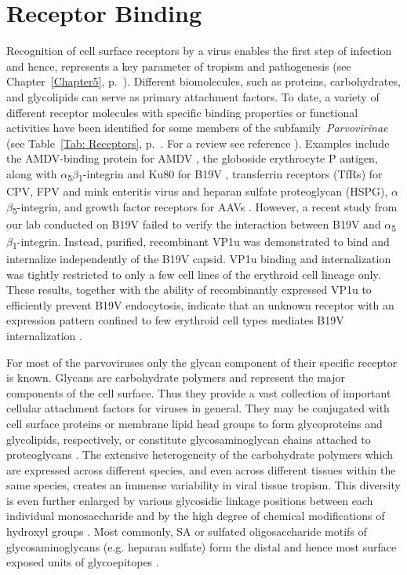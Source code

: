 \section{Receptor Binding}
\label{Binding}
Recognition of cell surface receptors by a virus enables the first step of infection and hence, represents a key parameter of tropism and pathogenesis (see Chapter~\ref{Chapter5}, p.~\pageref{Chapter5}). Different biomolecules, such as proteins, carbohydrates, and glycolipids can serve as primary attachment factors. To date, a variety of different receptor molecules with specific binding properties or functional activities have been identified for some members of the subfamily~\textit{Parvovirinae} (see Table~\ref{Tab: Receptors}, p.~\pageref{Tab: Receptors}. For a review see reference \cite{Receptor}). Examples include the AMDV-binding protein for AMDV \cite{pmid10196278}, the globoside erythrocyte P antigen, along with $\alpha$\textsubscript{5}$\beta$\textsubscript{1}-integrin and Ku80 for B19V \cite{pmid8211117, pmid15661151, pmid12907437, pmid16076874, weigel}, transferrin receptors (TfRs) for CPV, FPV and mink enteritis virus \cite{pmid16040076, pmid11264378} and heparan sulfate proteoglycan (HSPG), $\alpha$\textsubscript{}$\beta$\textsubscript{5}-integrin, and growth factor receptors for AAVs \cite{pmid14502277, pmid15596854, pmid9883842, pmid9445046, pmid9883843, pmid8599196}. However, a recent study from our lab conducted on B19V failed to verify the interaction between B19V and $\alpha$\textsubscript{5}$\beta$\textsubscript{1}-integrin. Instead, purified, recombinant VP1u was demonstrated to bind and internalize independently of the B19V capsid. VP1u binding and internalization was tightly restricted to only a few cell lines of the erythroid cell lineage only. These results, together with the ability of recombinantly expressed VP1u to efficiently prevent B19V endocytosis, indicate that an unknown receptor with an expression pattern confined to few erythroid cell types mediates B19V internalization \cite{pmid24067971}.  

For most of the parvoviruses only the glycan component of their specific receptor is known. Glycans are carbohydrate polymers and represent the major components of the cell surface. Thus they provide a vast collection of important cellular attachment factors for viruses in general. They may be conjugated with cell surface proteins or membrane lipid head groups to form glycoproteins and glycolipids, respectively, or constitute glycosaminoglycan chains attached to proteoglycans \cite{pmid16019714}. The extensive heterogeneity of the carbohydrate polymers which are expressed across different species, and even across different tissues within the same species, creates an immense variability in viral tissue tropism. This diversity is even further enlarged by various glycosidic linkage positions between each individual monosaccharide and by the high degree of chemical modifications of hydroxyl groups \cite{pmid11841250, pmid17632542}. Most commonly, SA or sulfated oligosaccharide motifs of glycosaminoglycans (e.g. heparan sulfate) form the distal and hence most surface exposed units of glycoepitopes \cite{pmid17072005}.


